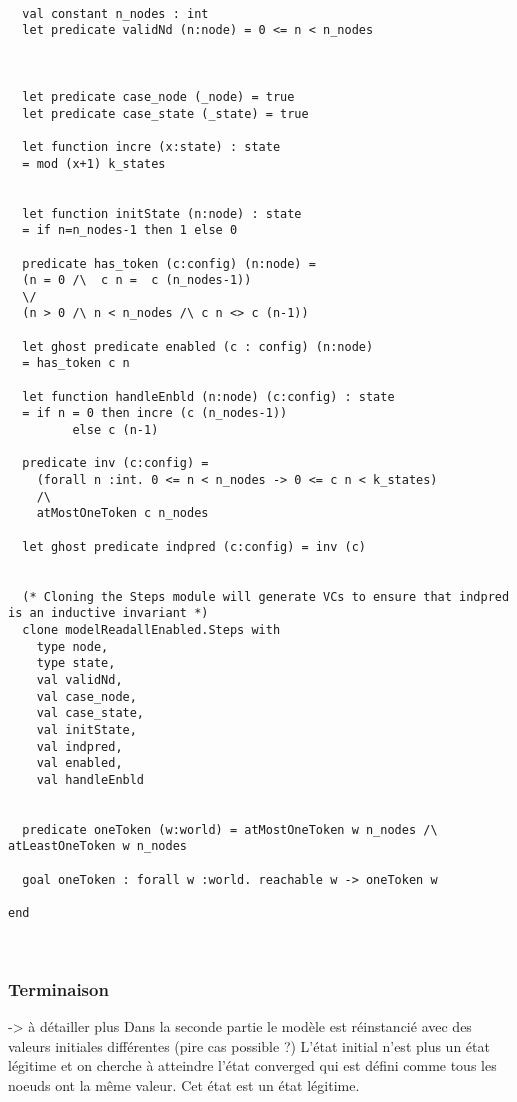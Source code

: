 \documentclass[11pt]{article}
\begin{document}
\lstset{language=why3,label= ,caption= ,captionpos=b,numbers=none}
\begin{lstlisting}

  val constant n_nodes : int
  let predicate validNd (n:node) = 0 <= n < n_nodes



  let predicate case_node (_node) = true
  let predicate case_state (_state) = true

  let function incre (x:state) : state
  = mod (x+1) k_states


  let function initState (n:node) : state
  = if n=n_nodes-1 then 1 else 0

  predicate has_token (c:config) (n:node) =
  (n = 0 /\  c n =  c (n_nodes-1))
  \/
  (n > 0 /\ n < n_nodes /\ c n <> c (n-1))

  let ghost predicate enabled (c : config) (n:node)
  = has_token c n

  let function handleEnbld (n:node) (c:config) : state
  = if n = 0 then incre (c (n_nodes-1))
	     else c (n-1)

  predicate inv (c:config) =
    (forall n :int. 0 <= n < n_nodes -> 0 <= c n < k_states)
    /\
    atMostOneToken c n_nodes

  let ghost predicate indpred (c:config) = inv (c)


  (* Cloning the Steps module will generate VCs to ensure that indpred is an inductive invariant *)
  clone modelReadallEnabled.Steps with
    type node,
    type state,
    val validNd,
    val case_node,
    val case_state,
    val initState,
    val indpred,
    val enabled,
    val handleEnbld


  predicate oneToken (w:world) = atMostOneToken w n_nodes /\ atLeastOneToken w n_nodes

  goal oneToken : forall w :world. reachable w -> oneToken w

end



\end{lstlisting}
\subsubsection{Terminaison}
\label{sec:orgb1cd3f4}

-> à détailler plus
Dans la seconde partie le modèle est réinstancié avec des valeurs initiales différentes (pire cas possible ?)
L'état initial n'est plus un état légitime et on cherche à atteindre l'état converged qui 
est défini comme tous les noeuds ont la même valeur. Cet état est un état légitime. 
\end{document}

